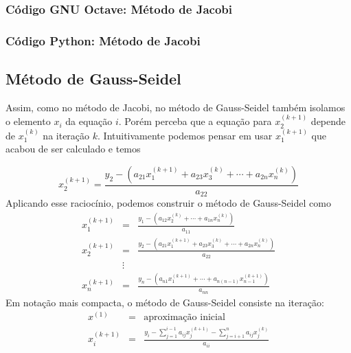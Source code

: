 \subsubsection{Código GNU Octave: Método de Jacobi}


\fi
\ifispython
\subsubsection{Código Python: Método de Jacobi}


\fi

\subsection{Método de Gauss-Seidel}

Assim, como no método de Jacobi, no método de Gauss-Seidel também isolamos o elemento $x_i$ da equação $i$. Porém perceba que a equação para $x_2^{(k+1)}$ depende de $x_1^{(k)}$ na iteração $k$. Intuitivamente podemos pensar em usar $x_1^{(k+1)}$ que acabou de ser calculado e temos

\begin{equation}
x_2^{(k+1)} =\frac{y_2 - \left(a_{21}x_1^{(k+1)}+a_{23}x_3^{(k)}+\cdots+a_{2n}x_n^{(k)}\right)}{a_{22}}
\end{equation}
Aplicando esse raciocínio, podemos construir o método de Gauss-Seidel como
\begin{eqnarray}
x_1^{(k+1)}&=&\frac{y_1 - \left(a_{12}x_2^{(k)}+\cdots+a_{1n}x_n^{(k)}\right)}{a_{11}}\\
x_2^{(k+1)}&=&\frac{y_2 - \left(a_{21}x_1^{(k+1)}+a_{23}x_3^{(k)}+\cdots+a_{2n}x_n^{(k)}\right)}{a_{22}}\\
&\vdots&\\
x_n^{(k+1)}&=&\frac{y_n - \left(a_{n1}x_1^{(k+1)}+\cdots+a_{n(n-1)}x_{n-1}^{(k+1)}\right)}{a_{nn}}
\end{eqnarray}
Em notação mais compacta, o método de Gauss-Seidel consiste na iteração:
\begin{eqnarray}
  x^{(1)} &=& \text{aproximação inicial}\\
  x_i^{(k+1)} &=& \frac{y_i - \sum_{j=1}^{i-1} a_{ij}x_j^{(k+1)} -\sum_{j=i+1}^{n} a_{ij}x_j^{(k)}}{a_{ii}}
\end{eqnarray}

